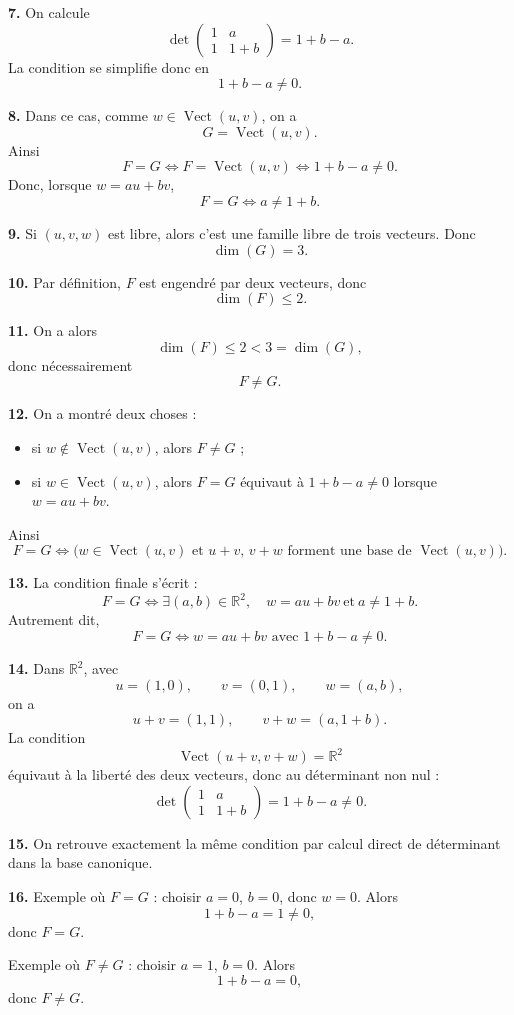\documentclass[11pt,a4paper]{article}
\newcommand{\R}{\mathbb{R}}
\newcommand{\Vect}{\operatorname{Vect}}
\newcommand{\dimv}{\operatorname{dim}}
\newcommand{\p}[1]{\medskip\noindent\textbf{#1.}}
\begin{document}
\p{7} On calcule
\[
\det\begin{pmatrix}
1 & a\\
1 & 1+b
\end{pmatrix}=1+b-a.
\]
La condition se simplifie donc en
\[
1+b-a\neq 0.
\]

\p{8} Dans ce cas, comme $w\in\Vect(u,v)$, on a
\[
G=\Vect(u,v).
\]
Ainsi
\[
F=G
\iff F=\Vect(u,v)
\iff 1+b-a\neq 0.
\]
Donc, lorsque $w=au+bv$,
\[
F=G \iff a\neq 1+b.
\]

\p{9} Si $(u,v,w)$ est libre, alors c'est une famille libre de trois vecteurs. Donc
\[
\dimv(G)=3.
\]

\p{10} Par définition, $F$ est engendré par deux vecteurs, donc
\[
\dimv(F)\leq 2.
\]

\p{11} On a alors
\[
\dimv(F)\leq 2<3=\dimv(G),
\]
donc nécessairement
\[
F\neq G.
\]

\p{12} On a montré deux choses :
\begin{itemize}
    \item si $w\notin\Vect(u,v)$, alors $F\neq G$ ;
    \item si $w\in\Vect(u,v)$, alors $F=G$ équivaut à $1+b-a\neq 0$ lorsque $w=au+bv$.
\end{itemize}
Ainsi
\[
F=G
\iff \bigl(w\in\Vect(u,v)\text{ et }u+v,\,v+w\text{ forment une base de }\Vect(u,v)\bigr).
\]

\p{13} La condition finale s'écrit :
\[
F=G \iff \exists(a,b)\in\R^2,\quad w=au+bv\ \text{et}\ a\neq 1+b.
\]
Autrement dit,
\[
F=G \iff w=au+bv\text{ avec }1+b-a\neq 0.
\]

\p{14} Dans $\R^2$, avec
\[
u=(1,0),\qquad v=(0,1),\qquad w=(a,b),
\]
on a
\[
u+v=(1,1),
\qquad
v+w=(a,1+b).
\]
La condition
\[
\Vect(u+v,v+w)=\R^2
\]
équivaut à la liberté des deux vecteurs, donc au déterminant non nul :
\[
\det\begin{pmatrix}
1 & a\\
1 & 1+b
\end{pmatrix}=1+b-a\neq 0.
\]

\p{15} On retrouve exactement la même condition par calcul direct de déterminant dans la base canonique.

\p{16} Exemple où $F=G$ : choisir $a=0$, $b=0$, donc $w=0$. Alors
\[
1+b-a=1\neq 0,
\]
donc $F=G$.

Exemple où $F\neq G$ : choisir $a=1$, $b=0$. Alors
\[
1+b-a=0,
\]
donc $F\neq G$.
\end{document}
